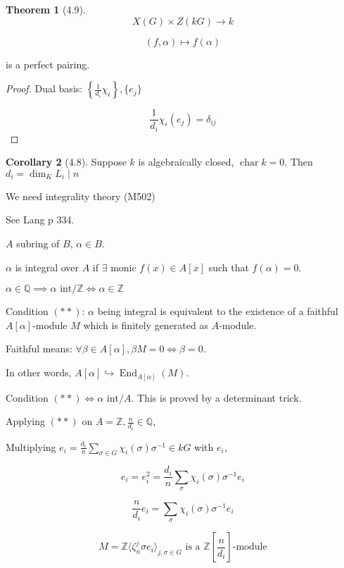 \documentclass{article}
\theoremstyle{definition}
\newtheorem{theorem}{Theorem}
\newtheorem{corollary}[theorem]{Corollary}
\newcommand{\Char}{\operatorname{char}}
\begin{document}
\begin{theorem}
    [4.9] 

    \[
        X(G) \times Z(kG) \to k
    \]

    \[
        (f,\alpha) \mapsto f(\alpha)
    \]

    is a perfect pairing.
\end{theorem}


\begin{proof}
    Dual basis: \(\left\{ \frac{1}{d_i} \chi_i \right\}, \{ e_j \} \) 

    \[
        \frac{1}{d_i} \chi_i(e_j) = \delta_{ij}
    \]
\end{proof}

\begin{corollary}
    [4.8] Suppose \(k\) is algebraically closed, \(\Char k = 0\). Then \(d_i = \dim_K L_i \mid n\) 
\end{corollary}

We need integrality theory (M502)

See Lang p 334.

\(A\) subring of \(B\), \(\alpha \in B\).

\(\alpha\) is integral over \(A\) if \(\exists\) monic \(f(x)\in A[x]\) such that \(f(\alpha) = 0\).

\(\alpha \in \mathbb{Q} \implies \alpha \text{ int} / \mathbb{Z} \iff \alpha \in \mathbb{Z} \) 


Condition \((\ast\ast)\): \(\alpha\) being integral is equivalent to the existence of a faithful \(A[\alpha]\)-module \(M\) which is finitely generated as \(A\)-module.

Faithful means: \(\forall \beta \in A[\alpha], \beta M = 0 \iff \beta  = 0\).

In other words, \(A[\alpha]\hookrightarrow \operatorname{End}_{A[\alpha]}(M)\).

Condition \((\ast\ast) \iff \alpha \text{ int}/A \). This is proved by a determinant trick.

Applying \((\ast\ast)\) on \(A=\mathbb{Z}, \frac{n}{d_i}\in\mathbb{Q}\),

Multiplying \(e_i = \frac{d_i}{n} \sum_{\sigma \in G} \chi_i (\sigma) \sigma ^{-1} \in kG\) with \(e_i\),

\[
    e_i = e_i^2 = \frac{d_i}{n} \sum_{\sigma} \chi_i(\sigma) \sigma^{-1} e_i 
\]

\[
    \frac{n}{d_i} e_i = \sum_{\sigma} \chi_i(\sigma) \sigma ^{-1} e_i
\]

\[
    M = \mathbb{Z} \langle \zeta_n^j \sigma e_i \rangle_{j,\sigma \in G} \text{ is a } \mathbb{Z}\left[ \frac{n}{d_i}\right]\text{-module}  
\]
\end{document}
